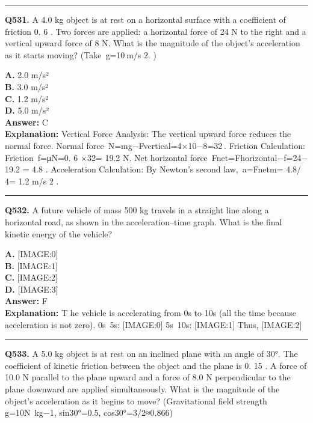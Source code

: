 \documentclass[12pt]{article}
\begin{document}
\hrule
\vspace{1em}


\noindent
\textbf{Q531.} A 4.0 kg object is at rest on a horizontal surface with a coefficient of friction 0.
6
. Two forces are applied: a horizontal force of 24 N to the right and a vertical upward force of 8 N. What is the magnitude of the object’s acceleration as it starts moving? (Take g=10 m/s
2.
)



\textbf{A.} 2.0 m/s² \\
\textbf{B.} 3.0 m/s² \\
\textbf{C.} 1.2
m/s² \\
\textbf{D.} 5.0 m/s² \\

\textbf{Answer:} C \\
\textbf{Explanation:} Vertical Force Analysis: The vertical upward force reduces the normal force.
Normal force N=mg−Fvertical=4×10−8=32 .
Friction Calculation: Friction f=μN=0.
6
×32=
19.2
N.
Net horizontal force Fnet=Fhorizontal−f=24−
19.2
=
4.8
.
Acceleration Calculation: By Newton’s second law, a=Fnetm=
4.8/
4=
1.2
m/s
2
.

\hrule
\vspace{1em}


\noindent
\textbf{Q532.} A future vehicle of mass 500 kg travels in a straight line along a horizontal road, as shown in the acceleration–time graph.
What is the final kinetic energy of the vehicle?



\textbf{A.} [IMAGE:0] \\
\textbf{B.} [IMAGE:1] \\
\textbf{C.} [IMAGE:2] \\
\textbf{D.} [IMAGE:3] \\

\textbf{Answer:} F \\
\textbf{Explanation:} T
he vehicle is accelerating from 0s to 10s (all the time because acceleration is not zero).
0s~5s:
[IMAGE:0]
5s~10s:
[IMAGE:1]
Thus,
[IMAGE:2]

\hrule
\vspace{1em}


\noindent
\textbf{Q533.} A 5.0 kg object is at rest on an inclined plane with an angle of 30°. The coefficient of kinetic friction between the object and the plane is 0.
15
. A force of 10.0 N parallel to the plane upward and a force of 8.0 N perpendicular to the plane downward are applied simultaneously. What is the magnitude of the object's acceleration as it begins to move? (Gravitational field strength g=10N kg−1, sin30°=0.5, cos30°=3​/2≈0.866)
\end{document}
